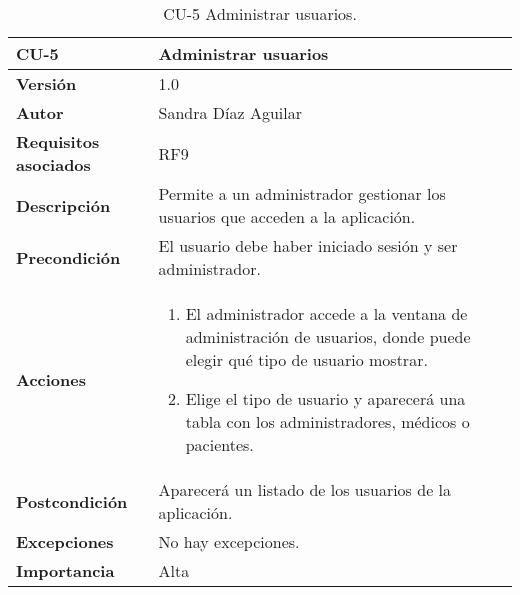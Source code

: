 \begin{table}[p]
	\centering
	\begin{tabularx}{\linewidth}{ p{} p{} }
		\toprule
		\textbf{CU-5}    & \textbf{Administrar usuarios}\\
		\toprule
		\textbf{Versión}              & 1.0    \\
		\textbf{Autor}                & Sandra Díaz Aguilar \\
		\textbf{Requisitos asociados} & RF9 \\
		\textbf{Descripción}          & Permite a un administrador gestionar los usuarios que acceden a la aplicación. \\
		\textbf{Precondición}         & El usuario debe haber iniciado sesión y ser administrador.  \\
		\textbf{Acciones}             &
		\begin{enumerate}
			\def\labelenumi{\arabic{enumi}.}
			\tightlist
			\item El administrador accede a la ventana de administración de usuarios, donde puede elegir qué tipo de usuario mostrar.
                \item Elige el tipo de usuario y aparecerá una tabla con los administradores, médicos o pacientes. 
		\end{enumerate}\\
		\textbf{Postcondición}        & Aparecerá un listado de los usuarios de la aplicación. \\
		\textbf{Excepciones}          & No hay excepciones. \\
		\textbf{Importancia}          & Alta \\
		\bottomrule
	\end{tabularx}
	\caption{CU-5 Administrar usuarios.}
\end{table}


